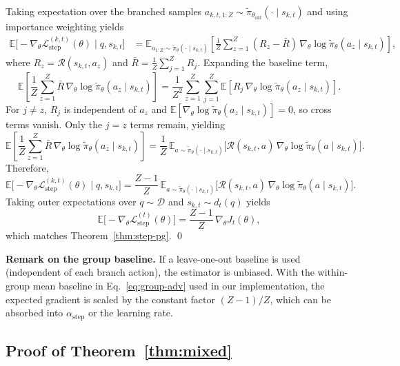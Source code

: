 \documentclass{article}
\theoremstyle{plain}
\theoremstyle{definition}
\theoremstyle{remark}
\begin{document}
Taking expectation over the branched samples $a_{k,t,1:Z}\sim \tilde{\pi}_{\theta_{\text{old}}}(\cdot\mid s_{k,t})$
and using importance weighting yields
\begin{align}
\mathbb{E}\bigl[-\nabla_\theta \mathcal{L}_{\text{step}}^{(k,t)}(\theta)\mid q,s_{k,t}\bigr]
&=
\mathbb{E}_{a_{1:Z} \sim \tilde{\pi}_\theta(\cdot\mid s_{k,t})}
\left[
\frac{1}{Z}\sum_{z=1}^Z (R_z-\bar R)\,\nabla_\theta \log \tilde{\pi}_\theta(a_z\mid s_{k,t})
\right],
\label{eq:app-step-exp1-new}
\end{align}
where $R_z=\mathcal{R}(s_{k,t},a_z)$ and $\bar R=\frac{1}{Z}\sum_{j=1}^Z R_j$.
Expanding the baseline term,
\[
\mathbb{E}\!\left[\frac{1}{Z}\sum_{z=1}^Z \bar R\,\nabla_\theta \log \tilde{\pi}_\theta(a_z\mid s_{k,t})\right]
=
\frac{1}{Z^2}\sum_{z=1}^Z\sum_{j=1}^Z
\mathbb{E}\!\left[R_j\,\nabla_\theta \log \tilde{\pi}_\theta(a_z\mid s_{k,t})\right].
\]
For $j\neq z$, $R_j$ is independent of $a_z$ and
$\mathbb{E}[\nabla_\theta \log \tilde{\pi}_\theta(a_z\mid s_{k,t})]=0$, so cross terms vanish.
Only the $j=z$ terms remain, yielding
\[
\mathbb{E}\!\left[\frac{1}{Z}\sum_{z=1}^Z \bar R\,\nabla_\theta \log \tilde{\pi}_\theta(a_z\mid s_{k,t})\right]
=
\frac{1}{Z}\,
\mathbb{E}_{a \sim \tilde{\pi}_\theta(\cdot\mid s_{k,t})}
\bigl[\mathcal{R}(s_{k,t},a)\,\nabla_\theta \log \tilde{\pi}_\theta(a\mid s_{k,t})\bigr].
\]
Therefore,
\[
\mathbb{E}\bigl[-\nabla_\theta \mathcal{L}_{\text{step}}^{(k,t)}(\theta)\mid q,s_{k,t}\bigr]
=
\frac{Z-1}{Z}\,
\mathbb{E}_{a \sim \tilde{\pi}_\theta(\cdot\mid s_{k,t})}
\bigl[\mathcal{R}(s_{k,t},a)\,\nabla_\theta \log \tilde{\pi}_\theta(a\mid s_{k,t})\bigr].
\]
Taking outer expectations over $q\sim\mathcal{D}$ and $s_{k,t}\sim d_t(q)$ yields
\[
\mathbb{E}\bigl[-\nabla_\theta \mathcal{L}_{\text{step}}^{(t)}(\theta)\bigr]
=
\frac{Z-1}{Z}\,\nabla_\theta J_t(\theta),
\]
which matches Theorem~\ref{thm:step-pg}. \qed


\textbf{Remark on the group baseline.}
If a leave-one-out baseline is used (independent of each branch action), the estimator is unbiased.
With the within-group mean baseline in Eq.~\ref{eq:group-adv} used in our implementation, the expected gradient is scaled by the constant factor $(Z-1)/Z$, which can be absorbed into $\alpha_{\text{step}}$ or the learning rate.



\subsection{Proof of Theorem~\ref{thm:mixed}}
\label{app:proof-mixed}
\end{document}
